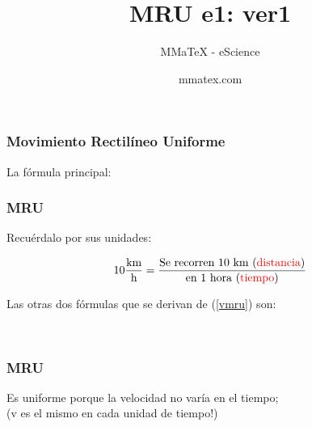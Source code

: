 \documentclass{beamer}
\title{MRU e1: ver1}
\subtitle{MMaTeX - eScience}
\author{mmatex.com}
\newcommand{\red}[1]{\textcolor{red}{#1}}
\begin{document}
\maketitle


\begin{frame}
\frametitle{Movimiento Rectil\'ineo Uniforme}
La f\'ormula principal:

{\huge \vmru}

\vNUa
\end{frame}

\begin{frame}
\frametitle{MRU}
Recu\'erdalo por sus unidades:

\begin{equation*}
10\frac{\text{km}}{\text{h}} =
\frac{\text{Se recorren 10 km (\red{distancia})}}
{\text{en 1 hora (\red{tiempo})}}
\end{equation*}

Las otras dos f\'ormulas que se derivan de (\ref{vmru}) son:

{\large \xmru \\ \tmru}
\end{frame}

\begin{frame}
\frametitle{MRU}
Es uniforme porque la velocidad no var\'ia en el tiempo; \\
(v es el mismo en cada unidad de tiempo!)

\begin{center}
\end{center}
\end{frame}
\end{document}
